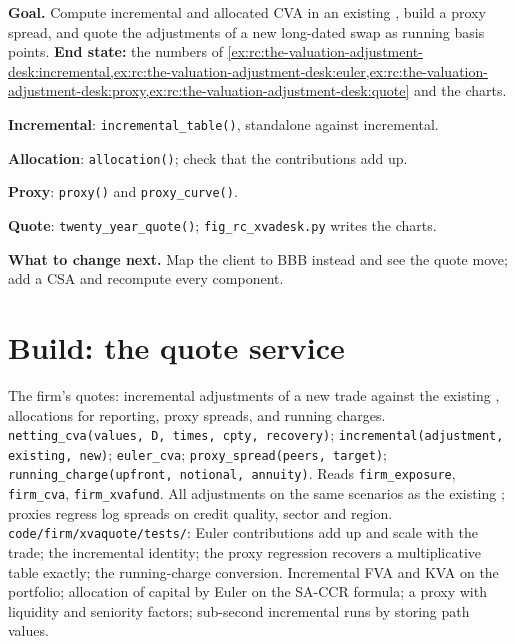 \begin{tutorial}
\textbf{Goal.} Compute incremental and allocated CVA in an existing , build a proxy
spread, and quote the adjustments of a new long-dated swap as running basis points.
\textbf{End state:} the numbers of
\cref{ex:rc:the-valuation-adjustment-desk:incremental,ex:rc:the-valuation-adjustment-desk:euler,ex:rc:the-valuation-adjustment-desk:proxy,ex:rc:the-valuation-adjustment-desk:quote}
and the charts.
\begin{tutsteps}
\item \textbf{Incremental}: \texttt{incremental\_table()}, standalone against incremental.
\item \textbf{Allocation}: \texttt{allocation()}; check that the contributions add up.
\item \textbf{Proxy}: \texttt{proxy()} and \texttt{proxy\_curve()}.
\item \textbf{Quote}: \texttt{twenty\_year\_quote()}; \texttt{fig\_rc\_xvadesk.py} writes the charts.
\end{tutsteps}
\textbf{What to change next.} Map the client to BBB instead and see the quote move; add a CSA
and recompute every component.
\end{tutorial}

\section{Build: the quote service}\label{bld:rc:the-valuation-adjustment-desk:xvaquote}

\begin{build}
 The firm's  quotes: incremental adjustments of a new trade against the
existing , allocations for reporting, proxy spreads, and running charges.
 \texttt{netting\_cva(values, D, times, cpty, recovery)};
\texttt{incremental(adjustment, existing, new)}; \texttt{euler\_cva}; \texttt{proxy\_spread(peers,
target)}; \texttt{running\_charge(upfront, notional, annuity)}. Reads \texttt{firm\_exposure},
\texttt{firm\_cva}, \texttt{firm\_xvafund}.
 All adjustments on the same scenarios as the existing ; proxies
regress log spreads on credit quality, sector and region.
 \texttt{code/firm/xvaquote/tests/}: Euler contributions add up and
scale with the trade; the incremental identity; the proxy regression recovers a
multiplicative table exactly; the running-charge conversion.
 Incremental FVA and KVA on the portfolio; allocation of capital by Euler on
the SA-CCR formula; a proxy with liquidity and seniority factors; sub-second incremental runs
by storing path values.
\end{build}

